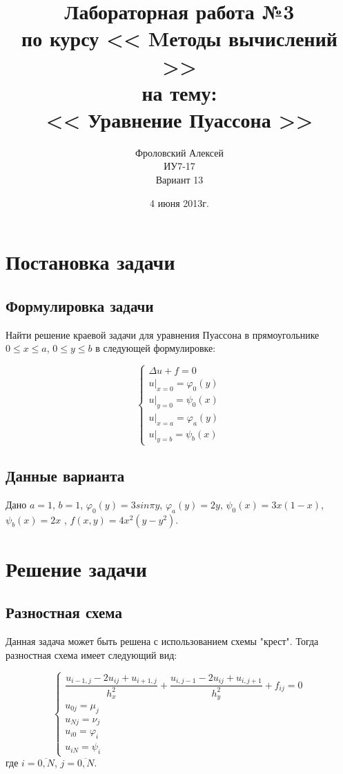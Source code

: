 \documentclass[a4paper,12pt]{report}
\author{Фроловский Алексей \\ ИУ7-17 \\ Вариант 13}
\title{Лабораторная работа №3 \\ по курсу << Mетоды вычислений >>  \\ на тему: \\  
<< Уравнение Пуассона >> }
\date{4 июня 2013г.}
\begin{document}
\maketitle

\chapter{Постановка задачи}
\section{Формулировка задачи}
Найти решение краевой задачи для уравнения Пуассона в прямоугольнике $0 \le x \le a$,
$0 \le y \le b$ в следующей формулировке:

\begin{displaymath}
	\left\{
		\begin{array}{l}
			\Delta u + f = 0 \\
			u\vert_{x=0} =  \varphi_{0}(y)  \\
			u\vert_{y=0} =  \psi_{0}(x)  \\
			u\vert_{x=a} =  \varphi_{a}(y) \\
			u\vert_{y=b} =  \psi_{b}(x)
		\end{array} \right.
\end{displaymath}

\section{Данные варианта}
Дано $a = 1$, $b = 1$, $\varphi_{0}(y) = 3sin\pi y$, $\varphi_{a}(y) = 2y$, $\psi_{0}(x) = 3x(1-x)$, 
$\psi_{b}(x) = 2x$ , $f(x, y) = 4x^{2}(y-y^{2})$.

\chapter{Решение задачи}
\section{Разностная схема}
Данная задача может быть решена с использованием схемы "крест". Тогда разностная схема имеет
следующий вид:

\begin{displaymath}
	\left\{
		\begin{array}{l}
			\dfrac{u_{i-1, j} - 2u_{ij} + u_{i+1, j}}{h_{x}^{2}} + \dfrac{u_{i, j-1} - 2u_{ij} + u_{i, j+1}}{h_{y}^{2}} + f_{ij} = 0 \\
			u_{0j} = \mu_{j} \\
			u_{Nj} = \nu_{j}  \\
			u_{i0} = \varphi_{i} \\
			u_{iN} = \psi_{i}
		\end{array} \right.
\end{displaymath}
где $i = \overline{0, N}$, $j = \overline{0, N}$.
\end{document}
